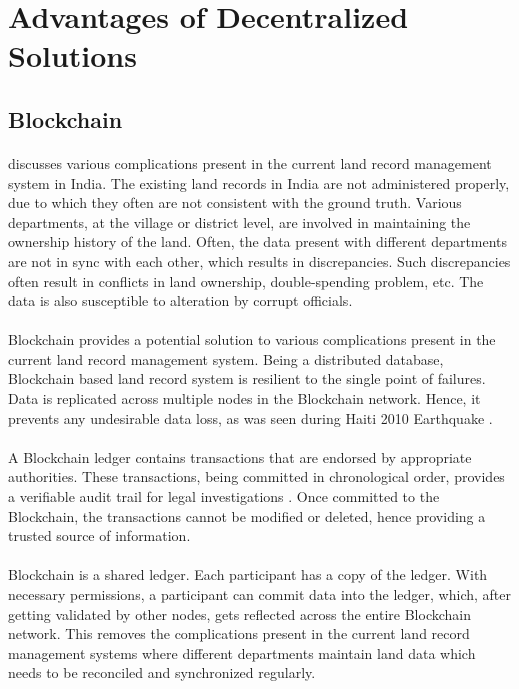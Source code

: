 \documentclass[12pt]{article}
\begin{document}
\section{Advantages of Decentralized Solutions}

    \subsection{Blockchain}
        \paragraph{}
        \cite{THAKUR2020101940} discusses various complications present in the current land record management system in India. The existing land records in India are not administered properly, due to which they often are not consistent with the ground truth. Various departments, at the village or district level, are involved in maintaining the ownership history of the land. Often, the data present with different departments are not in sync with each other, which results in discrepancies. Such discrepancies often result in conflicts in land ownership, double-spending problem, etc. The data is also susceptible to alteration by corrupt officials.

        \paragraph{}
        Blockchain provides a potential solution to various complications present in the current land record management system. Being a distributed database, Blockchain based land record system is resilient to the single point of failures. Data is replicated across multiple nodes in the Blockchain network. Hence, it prevents any undesirable data loss, as was seen during Haiti 2010 Earthquake \cite{haiti}.
        
        \paragraph{}
        A Blockchain ledger contains transactions that are endorsed by appropriate authorities. These transactions, being committed in chronological order, provides a verifiable audit trail for legal investigations \cite{Sahlin2018BlockchainIA}. Once committed to the Blockchain, the transactions cannot be modified or deleted, hence providing a trusted source of information.

        \paragraph{}
        Blockchain is a shared ledger. Each participant has a copy of the ledger. With necessary permissions, a participant can commit data into the ledger, which, after getting validated by other nodes, gets reflected across the entire Blockchain network. This removes the complications present in the current land record management systems where different departments maintain land data which needs to be reconciled and synchronized regularly.
    
\end{document}
